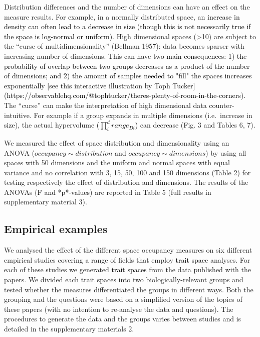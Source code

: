 \documentclass[]{article}
\begin{document}
Distribution differences and the number of dimensions can have an effect
on the measure results. For example, in a normally distributed space, an
\textcolor{black}{increase in density can often lead to a decrease in size (though this is not necessarily true if the space is log-normal or uniform)}.
High dimensional spaces (\textgreater{}10) are subject to the ``curse of
multidimensionality'' (Bellman 1957): data becomes sparser with
increasing number of dimensions.
\textcolor{black}{This can have two main consequences: 1) the probability of overlap between two groups decreases as a product of the number of dimensions; and 2) the amount of samples needed to "fill" the spaces increases exponentially [see this interactive illustration by Toph Tucker](https://observablehq.com/@tophtucker/theres-plenty-of-room-in-the-corners).}
The ``curse'' can make the interpretation of high dimensional data
counter-intuitive. For example if a group expands in multiple dimensions
(i.e.~increase in \textcolor{black}{size}), the actual
hypervolume \textcolor{black}{($\prod_{i}^{d} range_{Di}$)}
can decrease (Fig. 3 and Tables 6, 7).

We measured the effect of space distribution and dimensionality using an
ANOVA (\(occupancy \sim distribution\) and
\(occupancy \sim dimensions\)) by using all spaces with 50 dimensions
and the uniform and normal spaces with equal variance and no correlation
with 3, 15, 50, 100 and 150 dimensions (Table 2) for testing
respectively the effect of distribution and dimensions. The results of
the ANOVAs (\textcolor{black}{F and *p*-values}) are reported
in Table 5 (full results in supplementary material 3).

\subsection{Empirical examples}\label{empirical-examples}

We analysed the effect of the different space occupancy measures on six
different empirical studies covering a range of fields that employ
\textcolor{black}{trait space} analyses. For each of these
studies we generated \textcolor{black}{trait spaces} from the
data published with the papers. We divided each
\textcolor{black}{trait spaces} into two
biologically-relevant groups and tested whether the measures
differentiated the groups in different ways. Both the grouping and the
questions \textcolor{black}{were} based on a simplified
version of the topics of these papers (with no intention to re-analyse
the data and questions). The procedures to generate the data and the
groups varies between studies and is detailed in the supplementary
materials 2.
\end{document}
